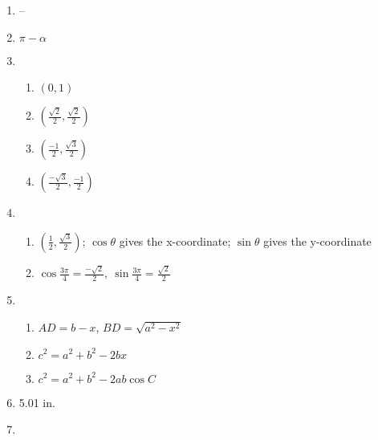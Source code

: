 \documentclass{article}
\begin{document}
\begin{enumerate}
\item --

\item $\pi - \alpha$

\item

	\begin{enumerate}
	
	\item $(0,1)$
	
	\item $\left( \frac{\sqrt{2}}{2}, \frac{\sqrt{2}}{2} \right)$
	
	\item $\left( \frac{-1}{2}, \frac{\sqrt{3}}{2} \right)$
	
	\item $\left( \frac{-\sqrt{3}}{2}, \frac{-1}{2} \right)$
	
	\end{enumerate}
	
\item

	\begin{enumerate}
	
	\item $\left( \frac{1}{2}, \frac{\sqrt{3}}{2} \right)$; $\cos{\theta}$ gives the x-coordinate; $\sin{\theta}$ gives the y-coordinate
	
	\item $\cos{ \frac{3 \pi}{4}} = \frac{-\sqrt{2}}{2}, \ \sin{ \frac{3 \pi}{4}} = \frac{\sqrt{2}}{2}$
	
	\end{enumerate}
	
\item 

	\begin{enumerate}
	
	\item $AD = b - x$, $BD = \sqrt{a^2 - x^2}$
	
	\item $c^2 = a^2 + b^2 - 2bx$
	
	\item $c^2 = a^2 + b^2 - 2ab\cos{C}$
	
	\end{enumerate}
	
\item 5.01 in.

\item

	\begin{enumerate}
	

\end{enumerate}
\end{enumerate}
\end{document}
